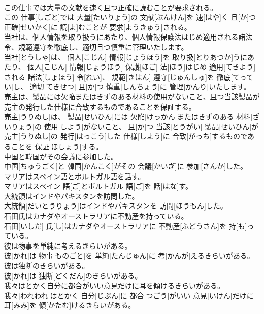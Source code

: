 \documentclass[8pt]{extreport}
\begin{document}
\begin{CJK}{UTF8}{min}
\\	この仕事では大量の文献を速く且つ正確に読むことが要求される。	
\\	この 仕事[しごと]では 大量[たいりょう]の 文献[ぶんけん]を 速[はや]く 且[か]つ 正確[せいかく]に 読[よ]むことが 要求[ようきゅう]される。
\\	当社は、個人情報を取り扱うにあたり、個人情報保護法はじめ適用される諸法令、規範遵守を徹底し、適切且つ慎重に管理いたします。	
\\	当社[とうしゃ]は、 個人[こじん] 情報[じょうほう]を 取り扱[とりあつか]うにあたり、 個人[こじん] 情報[じょうほう] 保護[ほご] 法[ほう]はじめ 適用[てきよう]される 諸法[しょほう] 令[れい]、 規範[きはん] 遵守[じゅんしゅ]を 徹底[てってい]し、 適切[てきせつ] 且[か]つ 慎重[しんちょう]に 管理[かんり]いたします。
\\	売主は、製品には欠陥またはきずのある材料の使用がないこと、且つ当該製品が売主の発行した仕様に合致するものであることを保証する。	
\\	売主[うりぬし]は、 製品[せいひん]には 欠陥[けっかん]またはきずのある 材料[ざいりょう]の 使用[しよう]がないこと、 且[か]つ 当該[とうがい] 製品[せいひん]が 売主[うりぬし]の 発行[はっこう]した 仕様[しよう]に 合致[がっち]するものであることを 保証[ほしょう]する。
\\	中国と韓国がその会議に参加した。	
\\	中国[ちゅうごく]と 韓国[かんこく]がその 会議[かいぎ]に 参加[さんか]した。
\\	マリアはスペイン語とポルトガル語を話す。	
\\	マリアはスペイン 語[ご]とポルトガル 語[ご]を 話[はな]す。
\\	大統領はインドやパキスタンを訪問した。	
\\	大統領[だいとうりょう]はインドやパキスタンを 訪問[ほうもん]した。
\\	石田氏はカナダやオーストラリアに不動産を持っている。	
\\	石田[いしだ] 氏[し]はカナダやオーストラリアに 不動産[ふどうさん]を 持[も]っている。
\\	彼は物事を単純に考えるきらいがある。	
\\	彼[かれ]は 物事[ものごと]を 単純[たんじゅん]に 考[かんが]えるきらいがある。
\\	彼は独断のきらいがある。	
\\	彼[かれ]は 独断[どくだん]のきらいがある。
\\	我々はとかく自分に都合がいい意見だけに耳を傾けるきらいがある。	
\\	我々[われわれ]はとかく 自分[じぶん]に 都合[つごう]がいい 意見[いけん]だけに 耳[みみ]を 傾[かたむ]けるきらいがある。

\end{CJK}
\end{document}
